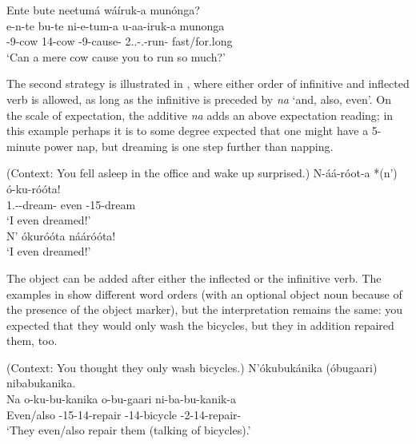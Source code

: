 \documentclass[output=paper]{langscibook}
\begin{document}
\z

\ea
\label{bkm:Ref98835727}
Ente  bute  neetumá  wáíruk-a  munónga?\\
\gll
e-n-te  bu-te  ni-e-tum-a  u-aa-iruk-a  munonga\\
\AUG{}-9-cow  14-cow  \IPFV{}-9\SM{}-cause-\FV{}  2.\SG.\SM{}-\N.\PST{}-run-\FV{}  fast/for.long\\
\glt
‘Can a mere cow cause you to run so much?’\\


\z


The second strategy is illustrated in , where either order of infinitive and inflected verb is allowed, as long as the infinitive is preceded by \textit{na} ‘and, also, even’. On the scale of expectation, the additive \textit{na} adds an above expectation reading; in this example perhaps it is to some degree expected that one might have a 5-minute power nap, but dreaming is one step further than napping.

\ea
\label{bkm:Ref98835774}
(Context: You fell asleep in the office and wake up surprised.) 
\ea
\gll
N-áá-róot-a   *(n’)  ó-ku-róóta!\\
1\SG{}.\SM{}-\PST{}-dream-\FV{}  even  \AUG{}-15-dream\\
\glt
‘I even dreamed!’\\


\ex   N’ ókuróóta nááróóta!\\
    \glt ‘I even dreamed!’
\z
\z


The object can be added after either the inflected or the infinitive verb. The examples in  show different word orders (with an optional object noun because of the presence of the object marker), but the interpretation remains the same: you expected that they would only wash the bicycles, but they in addition repaired them, too.


\ea
\label{bkm:Ref100084512}(Context: You thought they only wash bicycles.)
\ea
N’ókubukánika (óbugaari) nibabukanika.\\
\gll
Na  o-ku-bu-kanika  o-bu-gaari  ni-ba-bu-kanik-a\\
Even/also  \AUG{}-15-14\OM{}-repair  \AUG{}-14-bicycle  \IPFV{}-2\SM{}-14\OM{}-repair-\FV{}\\
\glt
‘They even/also repair them (talking of bicycles).’\\
\end{document}

